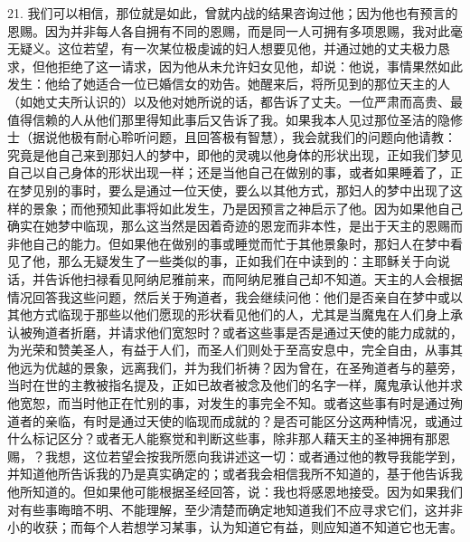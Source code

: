 21. 我们可以相信，那位就是如此，曾就内战的结果咨询过他；因为他也有预言的恩赐。因为并非每人各自拥有不同的恩赐，而是同一人可拥有多项恩赐，我对此毫无疑义。这位若望，有一次某位极虔诚的妇人想要见他，并通过她的丈夫极力恳求，但他拒绝了这一请求，因为他从未允许妇女见他，却说：他说，事情果然如此发生：他给了她适合一位已婚信女的劝告。她醒来后，将所见到的那位天主的人（如她丈夫所认识的）以及他对她所说的话，都告诉了丈夫。一位严肃而高贵、最值得信赖的人从他们那里得知此事后又告诉了我。如果我本人见过那位圣洁的隐修士（据说他极有耐心聆听问题，且回答极有智慧），我会就我们的问题向他请教：究竟是他自己来到那妇人的梦中，即他的灵魂以他身体的形状出现，正如我们梦见自己以自己身体的形状出现一样；还是当他自己在做别的事，或者如果睡着了，正在梦见别的事时，要么是通过一位天使，要么以其他方式，那妇人的梦中出现了这样的景象；而他预知此事将如此发生，乃是因预言之神启示了他。因为如果他自己确实在她梦中临现，那么这当然是因着奇迹的恩宠而非本性，是出于天主的恩赐而非他自己的能力。但如果他在做别的事或睡觉而忙于其他景象时，那妇人在梦中看见了他，那么无疑发生了一些类似的事，正如我们在中读到的：主耶稣关于向说话，并告诉他扫禄看见阿纳尼雅前来，而阿纳尼雅自己却不知道。天主的人会根据情况回答我这些问题，然后关于殉道者，我会继续问他：他们是否亲自在梦中或以其他方式临现于那些以他们愿现的形状看见他们的人，尤其是当魔鬼在人们身上承认被殉道者折磨，并请求他们宽恕时？或者这些事是否是通过天使的能力成就的，为光荣和赞美圣人，有益于人们，而圣人们则处于至高安息中，完全自由，从事其他远为优越的景象，远离我们，并为我们祈祷？因为曾在，在圣殉道者与的墓旁，当时在世的主教被指名提及，正如已故者被念及他们的名字一样，魔鬼承认他并求他宽恕，而当时他正在忙别的事，对发生的事完全不知。或者这些事有时是通过殉道者的亲临，有时是通过天使的临现而成就的？是否可能区分这两种情况，或通过什么标记区分？或者无人能察觉和判断这些事，除非那人藉天主的圣神拥有那恩赐，？我想，这位若望会按我所愿向我讲述这一切：或者通过他的教导我能学到，并知道他所告诉我的乃是真实确定的；或者我会相信我所不知道的，基于他告诉我他所知道的。但如果他可能根据圣经回答，说：我也将感恩地接受。因为如果我们对有些事晦暗不明、不能理解，至少清楚而确定地知道我们不应寻求它们，这并非小的收获；而每个人若想学习某事，认为知道它有益，则应知道不知道它也无害。\par

